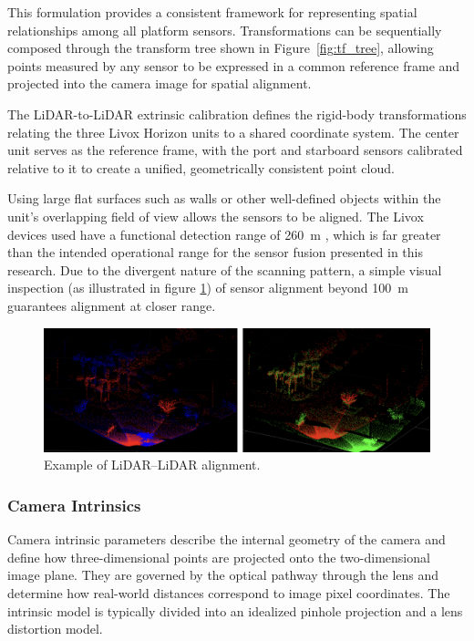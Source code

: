 \documentclass[../main.tex]{subfiles}
\begin{document}
This formulation provides a consistent framework for representing spatial relationships among all platform sensors.  
Transformations can be sequentially composed through the transform tree shown in Figure~\ref{fig:tf_tree}, allowing points measured by any sensor to be expressed in a common reference frame and projected into the camera image for spatial alignment.

The \ac{LiDAR}-to-\ac{LiDAR} extrinsic calibration defines the rigid-body transformations relating the three Livox Horizon units to a shared coordinate system.  
The center unit serves as the reference frame, with the port and starboard sensors calibrated relative to it to create a unified, geometrically consistent point cloud.

Using large flat surfaces such as walls or other well-defined objects within the unit's overlapping field of view allows the sensors to be aligned.
The Livox devices used have a functional detection range of 260~m \cite{livox_manual}, which is far greater than the intended operational range for the sensor fusion presented in this research. 
Due to the divergent nature of the scanning pattern, a simple visual inspection  (as illustrated in figure \ref{fig:Lidar2Lidar}) of sensor alignment beyond 100~m guarantees alignment at closer range. 

\begin{figure}[htbp]
    \centering
    \includegraphics[width=0.9\linewidth]{Images/Lidar2Lidar.png}
    \caption{Example of LiDAR–LiDAR alignment.}
    \label{fig:Lidar2Lidar}
\end{figure}

\subsubsection{Camera Intrinsics} \label{camera_intrinsics}

Camera intrinsic parameters describe the internal geometry of the camera and define how three-dimensional points are projected onto the two-dimensional image plane.  
They are governed by the optical pathway through the lens and determine how real-world distances correspond to image pixel coordinates.  
The intrinsic model is typically divided into an idealized pinhole projection and a lens distortion model.
\end{document}
